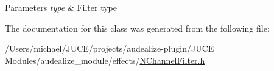 \begin{DoxyParams}{Parameters}
{\em type} & Filter type \\
\hline
\end{DoxyParams}


The documentation for this class was generated from the following file\+:\begin{DoxyCompactItemize}
\item 
/\+Users/michael/\+J\+U\+C\+E/projects/audealize-\/plugin/\+J\+U\+C\+E Modules/audealize\+\_\+module/effects/\hyperlink{_n_channel_filter_8h}{N\+Channel\+Filter.\+h}\end{DoxyCompactItemize}
